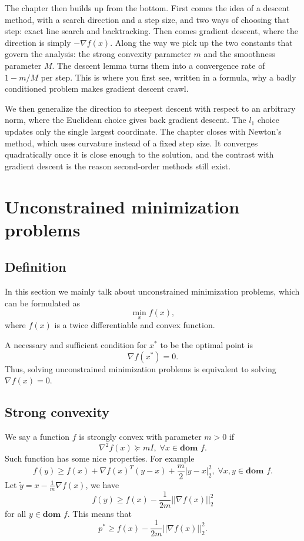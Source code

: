 \documentclass[lang=en,color=blue,mode=fancy,titlestyle=hang]{elegantbook}
\begin{document}
The chapter then builds up from the bottom. First comes the idea of a descent method, with a
search direction and a step size, and two ways of choosing that step: exact line search and
backtracking. Then comes gradient descent, where the direction is simply $-\nabla f(x)$.
Along the way we pick up the two constants that govern the analysis: the strong convexity
parameter $m$ and the smoothness parameter $M$. The descent lemma turns them into a
convergence rate of $1 - m/M$ per step. This is where you first see, written in a formula,
why a badly conditioned problem makes gradient descent crawl.

We then generalize the direction to steepest descent with respect to an arbitrary norm,
where the Euclidean choice gives back gradient descent. The $l_1$ choice updates only the
single largest coordinate. The chapter closes with Newton's method, which uses curvature
instead of a fixed step size. It converges quadratically once it is close enough to the
solution, and the contrast with gradient descent is the reason second-order methods still
exist.


\section{Unconstrained minimization problems}
\subsection{Definition}
In this section we mainly talk about unconstrained minimization problems, which can be formulated as
\[
\min_x f(x),
\]
where $f(x)$ is a twice differentiable and convex function.

A necessary and sufficient condition for $x^*$ to be the optimal point is
\[
\nabla f(x^*) = 0.
\]
Thus, solving unconstrained minimization problems is equivalent to solving $\nabla f(x) = 0$.

\subsection{Strong convexity}
We say a function $f$ is strongly convex with parameter $m > 0$ if
\[
\nabla^2 f(x) \succeq m I, \; \forall x \in \textbf{dom } f.
\]
Such function has some nice properties. For example
\[
f(y) \geq f(x) + \nabla f(x)^T (y - x) + \frac{m}{2} |y - x|_2^2, \; \forall x, y \in \textbf{dom } f.
\]
Let $\tilde{y} = x- \frac{1}{m} \nabla f(x)$, we have
\[
f(y) \geq f(x) - \frac{1}{2m} ||\nabla f(x)||_2^2
\]
for all $y \in \textbf{dom } f$. This means that
\[
p^* \geq f(x) - \frac{1}{2m} ||\nabla f(x)||_2^2.
\]
\end{document}
